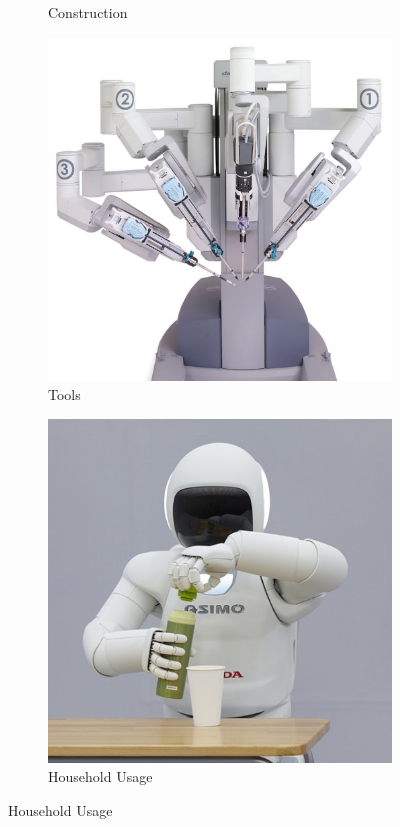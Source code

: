 \documentclass{beamer}
\begin{document}
{\begin{figure}[p]
\begin{subfigure}[b]{0.24\textwidth}
                \caption*{Construction}
            \end{subfigure}
            \begin{subfigure}[b]{0.24\textwidth}
                \includegraphics[width=\textwidth]{imgs/transporte3.jpg}
                \caption*{Tools}
            \end{subfigure}
            \begin{subfigure}[b]{0.24\textwidth}
                \includegraphics[width=\textwidth]{imgs/transporte4.jpg}
                \caption*{Household Usage}
            \end{subfigure}

        \end{figure}
    }
\end{document}
